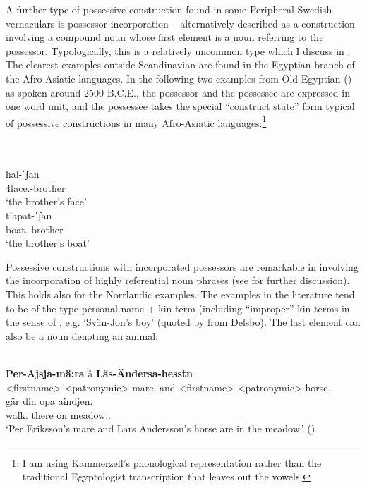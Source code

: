 A further type of possessive construction found in some Peripheral Swedish vernaculars is possessor incorporation – alternatively described as a construction involving a compound noun whose first element is a noun referring to the possessor. Typologically, this is a relatively uncommon type which I discuss in \citet{Dahl2004}. The clearest examples outside Scandinavian are found in the Egyptian branch of the Afro-Asiatic languages. In the following two examples from Old Egyptian (\citealt{Kammerzell2000}) as spoken around 2500 \textsc{B.C.E.}, the possessor and the possessee are expressed in one word unit, and the possessee takes the special “construct state” form typical of possessive constructions in many Afro-Asiatic languages:\footnote{ I am using Kammerzell’s phonological representation rather than the traditional Egyptologist transcription that leaves out the vowels.}

\ea
{}\\
\ea
{}\\
\gll ħal-ˈʃan\\
4face.{\cs}-brother\\
\glt ‘the brother’s face’  
\ex
{}\\
\gll t’apat-ˈʃan\\
boat.{\cs}-brother\\
\glt ‘the brother’s boat’
\z
\z

Possessive constructions with incorporated possessors are remarkable in involving the incorporation of highly referential noun phrases (see  for further discussion). This holds also for the Norrlandic examples. The examples in the literature tend to be of the type personal name + kin term (including “improper” kin terms in the sense of \citet{DahlEtAl2001}, e.g.  ‘Svän-Jon’s boy’ (quoted by \citet[38]{Delsing2003a} from Delsbo). The last element can also be a noun denoting an animal:

\ea%
\\
\gll \textbf{Per-Ajsja-mä:ra} å  \textbf{Läs-Ändersa-hesstn}\\
{\textless}firstname{\textgreater}-{\textless}patronymic{\textgreater}-mare.{}  and  {\textless}firstname{\textgreater}-{\textless}patronymic{\textgreater}-horse.{}\\
\gll gär  din  opa  aindjen.\\
walk.{\prs}  there  on  meadow.{}.{\dat}\\
\glt ‘Per Eriksson’s mare and Lars Andersson’s horse are in the meadow.’ (\citealt[164]{Källskog1992})
\z


